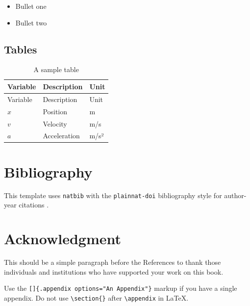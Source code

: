 \documentclass[
  11pt,
  twoside]{book}
\providecommand{\tightlist}{%
  \setlength{\itemsep}{0pt}\setlength{\parskip}{0pt}}
\theoremstyle{plain}
\theoremstyle{definition}
\theoremstyle{plain}
\theoremstyle{plain}
\theoremstyle{remark}
\begin{document}
\begin{itemize}
\tightlist
\item
  Bullet one
\item
  Bullet two
\end{itemize}

\section{Tables}\label{tables}

\begin{longtable}[]{@{}lll@{}}
\caption{A sample table}\label{tbl-sample}\tabularnewline
\toprule\noalign{}
Variable & Description & Unit \\
\midrule\noalign{}
\endfirsthead
\toprule\noalign{}
Variable & Description & Unit \\
\midrule\noalign{}
\endhead
\bottomrule\noalign{}
\endlastfoot
\(x\) & Position & m \\
\(v\) & Velocity & m/s \\
\(a\) & Acceleration & m/s² \\
\end{longtable}

\chapter{Bibliography}\label{bibliography}

This template uses \texttt{natbib} with the \texttt{plainnat-doi}
bibliography style for author-year citations
\citet{karatzas1991brownian}.

\chapter*{Acknowledgment}\label{acknowledgment}

This should be a simple paragraph before the References to thank those
individuals and institutions who have supported your work on this book.

{}

Use the \texttt{{[}{]}\{.appendix\ options="An\ Appendix"\}} markup if
you have a single appendix. Do not use
\texttt{\textbackslash{}section\{\}} after
\texttt{\textbackslash{}appendix} in LaTeX.


\let\stdchaptermark\chaptermark
\renewcommand{\chaptermark}[1]{}
\end{document}
